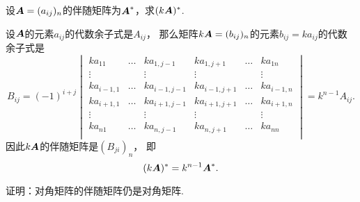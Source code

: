\begin{example}
设\(\boldsymbol{A}=(a_{ij})_n\)的伴随矩阵为\(\boldsymbol{A}^*\)，求\((k\boldsymbol{A})^*\).
\begin{solution}
设\(\boldsymbol{A}\)的元素\(a_{ij}\)的代数余子式是\(A_{ij}\)，
那么矩阵\(k\boldsymbol{A} = (b_{ij})_n\)的元素\(b_{ij} = k a_{ij}\)的代数余子式是\[
	B_{ij}
	= (-1)^{i+j}
	\begin{vmatrix}
		k a_{11} & \dots & k a_{1,j-1} & k a_{1,j+1} & \dots & k a_{1n} \\
		\vdots & & \vdots & \vdots & & \vdots \\
		k a_{i-1,1} & \dots & k a_{i-1,j-1} & k a_{i-1,j+1} & \dots & k a_{i-1,n} \\
		k a_{i+1,1} & \dots & k a_{i+1,j-1} & k a_{i+1,j+1} & \dots & k a_{i+1,n} \\
		\vdots & & \vdots & \vdots & & \vdots \\
		k a_{n1} & \dots & k a_{n,j-1} & k a_{n,j+1} & \dots & k a_{nn} \\
	\end{vmatrix}
	= k^{n-1} A_{ij}.
\]
因此\(k\boldsymbol{A}\)的伴随矩阵是\((B_{ji})_n\)，
即\begin{equation}\label{equation:行列式.伴随矩阵.数与矩阵乘积的伴随}
	(k \boldsymbol{A})^* = k^{n-1} \boldsymbol{A}^*.
\end{equation}
\end{solution}
\end{example}

\begin{example}
证明：对角矩阵的伴随矩阵仍是对角矩阵.
\end{example}


